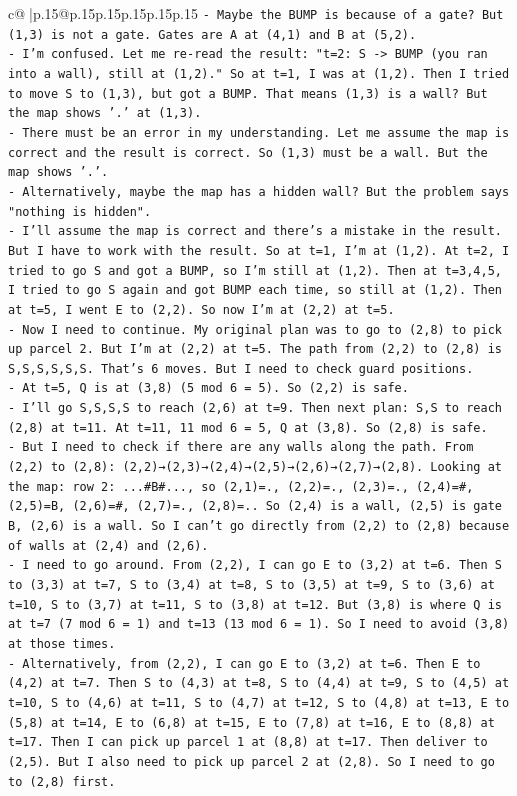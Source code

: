 \documentclass{article}
\begin{document}
{\begin{supertabular}{c@{$\;$}|p{.15\linewidth}@{}p{.15\linewidth}p{.15\linewidth}p{.15\linewidth}p{.15\linewidth}p{.15\linewidth}}
{{{\texttt{{-} Maybe the BUMP is because of a gate? But (1,3) is not a gate. Gates are A at (4,1) and B at (5,2).} \\
\texttt{{-} I'm confused. Let me re{-}read the result: "t=2: S {-}> BUMP (you ran into a wall), still at (1,2)." So at t=1, I was at (1,2). Then I tried to move S to (1,3), but got a BUMP. That means (1,3) is a wall? But the map shows '.' at (1,3).} \\
\texttt{{-} There must be an error in my understanding. Let me assume the map is correct and the result is correct. So (1,3) must be a wall. But the map shows '.'. } \\
\texttt{{-} Alternatively, maybe the map has a hidden wall? But the problem says "nothing is hidden".} \\
\texttt{{-} I'll assume the map is correct and there's a mistake in the result. But I have to work with the result. So at t=1, I'm at (1,2). At t=2, I tried to go S and got a BUMP, so I'm still at (1,2). Then at t=3,4,5, I tried to go S again and got BUMP each time, so still at (1,2). Then at t=5, I went E to (2,2). So now I'm at (2,2) at t=5.} \\
\texttt{{-} Now I need to continue. My original plan was to go to (2,8) to pick up parcel 2. But I'm at (2,2) at t=5. The path from (2,2) to (2,8) is S,S,S,S,S,S. That's 6 moves. But I need to check guard positions.} \\
\texttt{{-} At t=5, Q is at (3,8) (5 mod 6 = 5). So (2,2) is safe.} \\
\texttt{{-} I'll go S,S,S,S to reach (2,6) at t=9. Then next plan: S,S to reach (2,8) at t=11. At t=11, 11 mod 6 = 5, Q at (3,8). So (2,8) is safe.} \\
\texttt{{-} But I need to check if there are any walls along the path. From (2,2) to (2,8): (2,2)→(2,3)→(2,4)→(2,5)→(2,6)→(2,7)→(2,8). Looking at the map: row 2: ...\#B\#..., so (2,1)=., (2,2)=., (2,3)=., (2,4)=\#, (2,5)=B, (2,6)=\#, (2,7)=., (2,8)=.. So (2,4) is a wall, (2,5) is gate B, (2,6) is a wall. So I can't go directly from (2,2) to (2,8) because of walls at (2,4) and (2,6).} \\
\texttt{{-} I need to go around. From (2,2), I can go E to (3,2) at t=6. Then S to (3,3) at t=7, S to (3,4) at t=8, S to (3,5) at t=9, S to (3,6) at t=10, S to (3,7) at t=11, S to (3,8) at t=12. But (3,8) is where Q is at t=7 (7 mod 6 = 1) and t=13 (13 mod 6 = 1). So I need to avoid (3,8) at those times.} \\
\texttt{{-} Alternatively, from (2,2), I can go E to (3,2) at t=6. Then E to (4,2) at t=7. Then S to (4,3) at t=8, S to (4,4) at t=9, S to (4,5) at t=10, S to (4,6) at t=11, S to (4,7) at t=12, S to (4,8) at t=13, E to (5,8) at t=14, E to (6,8) at t=15, E to (7,8) at t=16, E to (8,8) at t=17. Then I can pick up parcel 1 at (8,8) at t=17. Then deliver to (2,5). But I also need to pick up parcel 2 at (2,8). So I need to go to (2,8) first.} \\
}}}
\end{supertabular}}
\end{document}
